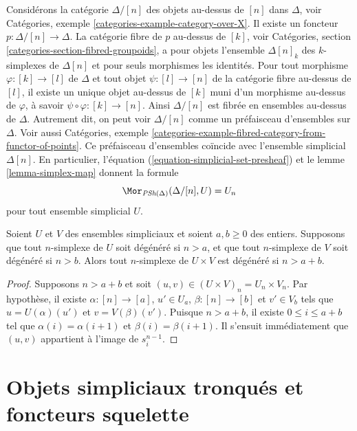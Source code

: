 \begin{example}
\label{example-simplex-category}
Considérons la catégorie $\Delta/[n]$ des objets au-dessus de $[n]$ dans
$\Delta$, voir Catégories, exemple \ref{categories-example-category-over-X}.
Il existe un foncteur $p : \Delta/[n] \to \Delta$.
La catégorie fibre de $p$ au-dessus de $[k]$, voir Catégories,
section \ref{categories-section-fibred-groupoids}, a pour objets l'ensemble
$\Delta[n]_k$ des $k$-simplexes de $\Delta[n]$ et pour seuls morphismes
les identités. Pour tout morphisme $\varphi : [k] \to [l]$ de $\Delta$
et tout objet $\psi : [l] \to [n]$ de la catégorie fibre au-dessus de
$[l]$, il existe un unique objet au-dessus de $[k]$ muni d'un morphisme
au-dessus de $\varphi$, à savoir $\psi \circ \varphi : [k] \to [n]$.
Ainsi $\Delta/[n]$ est fibrée en ensembles au-dessus de $\Delta$.
Autrement dit, on peut voir $\Delta/[n]$ comme un préfaisceau d'ensembles
sur $\Delta$. Voir aussi Catégories, exemple
\ref{categories-example-fibred-category-from-functor-of-points}.
Ce préfaisceau d'ensembles coïncide avec l'ensemble simplicial $\Delta[n]$.
En particulier, l'équation (\ref{equation-simplicial-set-presheaf}) et le
lemme \ref{lemma-simplex-map} donnent la formule
$$
\Mor_{\textit{PSh}(\Delta)}(\Delta/[n], U) = U_n
$$
pour tout ensemble simplicial $U$.
\end{example}

\begin{lemma}
\label{lemma-product-degenerate}
Soient $U$ et $V$ des ensembles simpliciaux et soient $a, b \geq 0$
des entiers. Supposons que tout $n$-simplexe de $U$ soit dégénéré si
$n > a$, et que tout $n$-simplexe de $V$ soit dégénéré si $n > b$.
Alors tout $n$-simplexe de $U \times V$ est dégénéré si $n > a + b$.
\end{lemma}

\begin{proof}
Supposons $n > a + b$ et soit
$(u, v) \in (U \times V)_n = U_n \times V_n$.
Par hypothèse, il existe $\alpha : [n] \to [a]$, $u' \in U_a$,
$\beta : [n] \to [b]$ et $v' \in V_b$ tels que
$u = U(\alpha)(u')$ et $v = V(\beta)(v')$. Puisque $n > a + b$,
il existe $0 \leq i \leq a + b$ tel que
$\alpha(i) = \alpha(i + 1)$ et $\beta(i) = \beta(i + 1)$.
Il s'ensuit immédiatement que $(u, v)$ appartient à l'image de
$s^{n - 1}_i$.
\end{proof}



\section{Objets simpliciaux tronqués et foncteurs squelette}
\label{section-skeleton}

